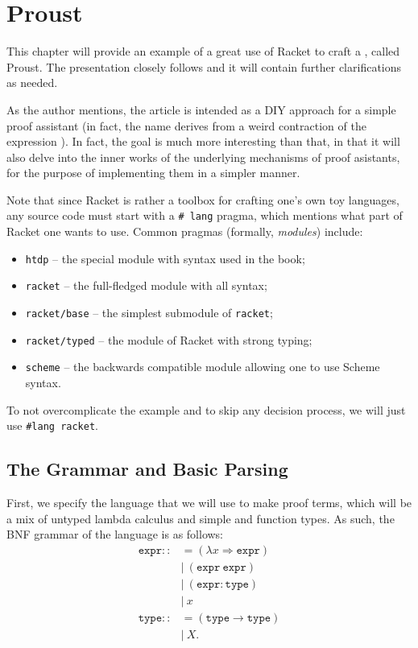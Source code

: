 \chapter{Proust}

This chapter will provide an example of a great use of Racket to craft
a , called Proust. The presentation closely
follows \cite{proust} and it will contain further clarifications as
needed.

As the author mentions, the article is intended as a DIY approach
for a simple proof assistant (in fact, the name derives from a weird
contraction of the expression ). In fact, the goal
is much more interesting than that, in that it will also delve into the
inner works of the underlying mechanisms of proof asistants, for the
purpose of implementing them in a simpler manner.

Note that since Racket is rather a toolbox for crafting one's own toy
languages, any source code must start with a \texttt{\# lang} pragma,
which mentions what part of Racket one wants to use. Common pragmas
(formally, \emph{modules}) include:
\begin{itemize}
\item \texttt{htdp} -- the special module with syntax used in the
  \cite{htdp} book;
\item \texttt{racket} -- the full-fledged module with all syntax;
\item \texttt{racket/base} -- the simplest submodule of \texttt{racket};
\item \texttt{racket/typed} -- the module of Racket with strong typing;
\item \texttt{scheme} -- the backwards compatible module allowing one
  to use Scheme syntax.
\end{itemize}

To not overcomplicate the example and to skip any decision process,
we will just use \texttt{\#lang racket}.

\section{The Grammar and Basic Parsing}

First, we specify the language that we will use to make proof terms,
which will be a mix of untyped lambda calculus and simple and function
types. As such, the BNF grammar of the language is as follows:
\begin{align*}
  \texttt{expr} ::&= (\lambda x \Rightarrow \texttt{expr}) \\
                  &| \ (\texttt{expr} \ \texttt{expr}) \\
                  &| \ (\texttt{expr} : \texttt{type}) \\
                  &| \ x \\
  \texttt{type} ::&= (\texttt{type} \to \texttt{type}) \\
                  &| \ X.
\end{align*}

